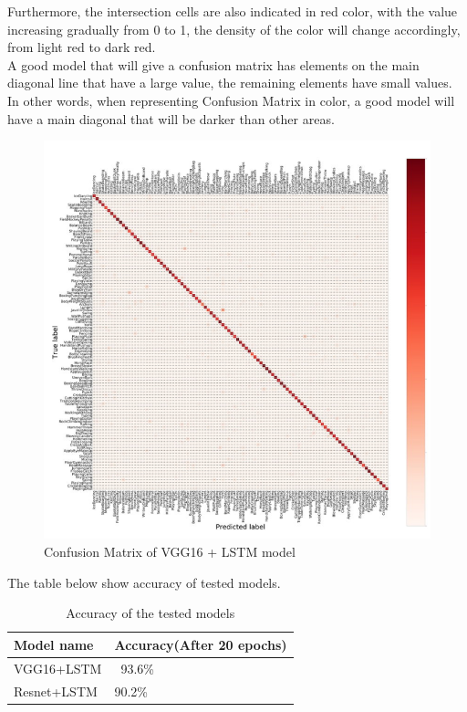 Furthermore, the intersection cells are also indicated in red color, with the value increasing gradually from 0 to 1, the density of the color will change accordingly, from light red to dark red.\\
A good model that will give a confusion matrix has elements on the main diagonal line that have a large value, the remaining elements have small values. In other words, when representing Confusion Matrix in color, a good model will have a main diagonal that will be darker than other areas.
\begin{center}
	\begin{figure}[H]
		\centering
		\includegraphics[width=1\columnwidth]{images/chap3/cfm-2.jpg}
		\caption{Confusion Matrix of VGG16 + LSTM model}
		\label{chap3:cfm-zoom}
	\end{figure}
\end{center}
\vspace{-1cm}
The table below show accuracy of tested models.
\begin{table}[H]
	\begin{tabular}{|P{5cm}|L{5cm}|}
		\hline
		\textbf{Model name}			&  \textbf{Accuracy}(After 20 epochs)
		\\ \hline
		VGG16+LSTM	 	&   ~93.6\%  
		\\ \hline
		Resnet+LSTM 	&  	90.2\%       
		\\ \hline
	\end{tabular}
\caption{Accuracy of the tested models}
\end{table}



